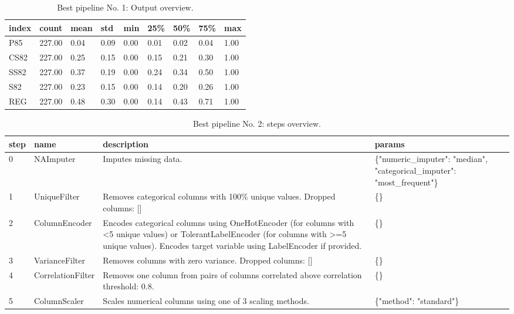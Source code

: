 \documentclass{article}%
\begin{document}
%


\begin{table}[H]%
\begin{center}%
\renewcommand{\arraystretch}{1.5}%
\begin{tabular}{l l l l l l l l l}%
\hline%
\textbf{index}&\textbf{count}&\textbf{mean}&\textbf{std}&\textbf{min}&\textbf{25\%}&\textbf{50\%}&\textbf{75\%}&\textbf{max}\\%
\hline%
P85&227.00&0.04&0.09&0.00&0.01&0.02&0.04&1.00\\%
CS82&227.00&0.25&0.15&0.00&0.15&0.21&0.30&1.00\\%
SS82&227.00&0.37&0.19&0.00&0.24&0.34&0.50&1.00\\%
S82&227.00&0.23&0.15&0.00&0.14&0.20&0.26&1.00\\%
REG&227.00&0.48&0.30&0.00&0.14&0.43&0.71&1.00\\%
\hline%
\end{tabular}%
\end{center}%
\caption{Best pipeline No. 1: Output overview.}%
\end{table}

%


\begin{table}[H]%
\begin{center}%
\renewcommand{\arraystretch}{1.5}%
\begin{tabular}{p{7mm} p{35mm} p{80mm} p{50mm}}%
\hline%
\textbf{step}&\textbf{name}&\textbf{description}&\textbf{params}\\%
\hline%
0&NAImputer&Imputes missing data.&\{"numeric\_imputer": "median", "categorical\_imputer": "most\_frequent"\}\\%
1&UniqueFilter&Removes categorical columns with 100\% unique values. Dropped columns: {[}{]}&\{\}\\%
2&ColumnEncoder&Encodes categorical columns using OneHotEncoder (for columns with <5 unique values) or TolerantLabelEncoder (for columns with >=5 unique values). Encodes target variable using LabelEncoder if provided.&\{\}\\%
3&VarianceFilter&Removes columns with zero variance. Dropped columns: {[}{]}&\{\}\\%
4&CorrelationFilter&Removes one column from pairs of columns correlated above correlation threshold: 0.8.&\{\}\\%
5&ColumnScaler&Scales numerical columns using one of 3 scaling methods.&\{"method": "standard"\}\\%
\hline%
\end{tabular}%
\end{center}%
\caption{Best pipeline No. 2: steps overview.}%
\end{table}
\end{document}
